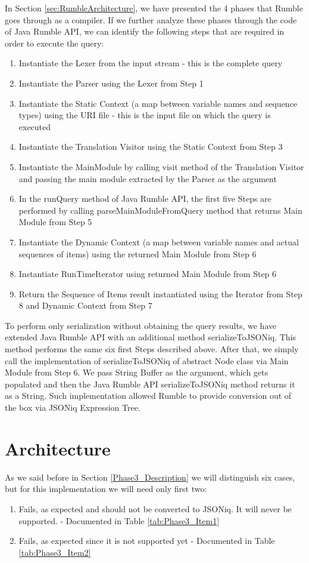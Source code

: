 In Section \ref{sec:RumbleArchitecture}, we have presented the 4 phases that Rumble goes through as a compiler. If we further analyze these phases through the code of Java Rumble API, we can identify the following steps that are required in order to execute the query:
\begin{enumerate}
	\item Instantiate the Lexer from the input stream - this is the complete query
	\item Instantiate the Parser using the Lexer from Step 1
	\item Instantiate the Static Context (a map between variable names and sequence types) using the URI file - this is the input file on which the query is executed 
	\item Instantiate the Translation Visitor using the Static Context from Step 3
	\item Instantiate the MainModule by calling visit method of the Translation Visitor and passing the main module extracted by the Parser as the argument
	\item In the runQuery method of Java Rumble API, the first five Steps are performed by calling parseMainModuleFromQuery method that returns Main Module from Step 5
	\item Instantiate the Dynamic Context (a map between variable names and actual sequences of items) using the returned Main Module from Step 6
	\item Instantiate RunTimeIterator using returned Main Module from Step 6
	\item Return the Sequence of Items result instantiated using the Iterator from Step 8 and Dynamic Context from Step 7
\end{enumerate}

To perform only serialization without obtaining the query results, we have extended Java Rumble API with an additional method serializeToJSONiq. This method performs the same six first Steps described above. After that, we simply call the implementation of serializeToJSONiq of abstract Node class via Main Module from Step 6. We pass String Buffer as the argument, which gets populated and then the Java Rumble API serializeToJSONiq method returns it as a String. Such implementation allowed Rumble to provide conversion out of the box via JSONiq Expression Tree.

\section{Architecture}
\label{sec:TestConverterImplementation}
As we said before in Section \ref{Phase3_Description} we will distinguish six cases, but for this implementation we will need only first two: 
\begin{enumerate}
	\item Fails, as expected and should not be converted to JSONiq. It will never be supported. - Documented in Table \ref{tab:Phase3_Item1}
	\item Fails, as expected since it is not supported yet - Documented in Table \ref{tab:Phase3_Item2}
\end{enumerate}


